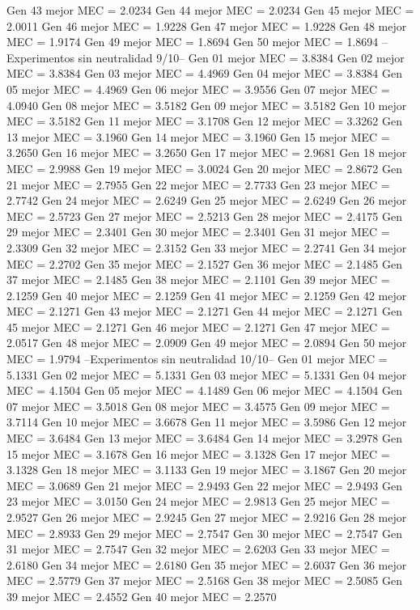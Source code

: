 Gen 43 mejor MEC = 2.0234
Gen 44 mejor MEC = 2.0234
Gen 45 mejor MEC = 2.0011
Gen 46 mejor MEC = 1.9228
Gen 47 mejor MEC = 1.9228
Gen 48 mejor MEC = 1.9174
Gen 49 mejor MEC = 1.8694
Gen 50 mejor MEC = 1.8694
--Experimentos sin neutralidad 9/10--
Gen 01 mejor MEC = 3.8384
Gen 02 mejor MEC = 3.8384
Gen 03 mejor MEC = 4.4969
Gen 04 mejor MEC = 3.8384
Gen 05 mejor MEC = 4.4969
Gen 06 mejor MEC = 3.9556
Gen 07 mejor MEC = 4.0940
Gen 08 mejor MEC = 3.5182
Gen 09 mejor MEC = 3.5182
Gen 10 mejor MEC = 3.5182
Gen 11 mejor MEC = 3.1708
Gen 12 mejor MEC = 3.3262
Gen 13 mejor MEC = 3.1960
Gen 14 mejor MEC = 3.1960
Gen 15 mejor MEC = 3.2650
Gen 16 mejor MEC = 3.2650
Gen 17 mejor MEC = 2.9681
Gen 18 mejor MEC = 2.9988
Gen 19 mejor MEC = 3.0024
Gen 20 mejor MEC = 2.8672
Gen 21 mejor MEC = 2.7955
Gen 22 mejor MEC = 2.7733
Gen 23 mejor MEC = 2.7742
Gen 24 mejor MEC = 2.6249
Gen 25 mejor MEC = 2.6249
Gen 26 mejor MEC = 2.5723
Gen 27 mejor MEC = 2.5213
Gen 28 mejor MEC = 2.4175
Gen 29 mejor MEC = 2.3401
Gen 30 mejor MEC = 2.3401
Gen 31 mejor MEC = 2.3309
Gen 32 mejor MEC = 2.3152
Gen 33 mejor MEC = 2.2741
Gen 34 mejor MEC = 2.2702
Gen 35 mejor MEC = 2.1527
Gen 36 mejor MEC = 2.1485
Gen 37 mejor MEC = 2.1485
Gen 38 mejor MEC = 2.1101
Gen 39 mejor MEC = 2.1259
Gen 40 mejor MEC = 2.1259
Gen 41 mejor MEC = 2.1259
Gen 42 mejor MEC = 2.1271
Gen 43 mejor MEC = 2.1271
Gen 44 mejor MEC = 2.1271
Gen 45 mejor MEC = 2.1271
Gen 46 mejor MEC = 2.1271
Gen 47 mejor MEC = 2.0517
Gen 48 mejor MEC = 2.0909
Gen 49 mejor MEC = 2.0894
Gen 50 mejor MEC = 1.9794
--Experimentos sin neutralidad 10/10--
Gen 01 mejor MEC = 5.1331
Gen 02 mejor MEC = 5.1331
Gen 03 mejor MEC = 5.1331
Gen 04 mejor MEC = 4.1504
Gen 05 mejor MEC = 4.1489
Gen 06 mejor MEC = 4.1504
Gen 07 mejor MEC = 3.5018
Gen 08 mejor MEC = 3.4575
Gen 09 mejor MEC = 3.7114
Gen 10 mejor MEC = 3.6678
Gen 11 mejor MEC = 3.5986
Gen 12 mejor MEC = 3.6484
Gen 13 mejor MEC = 3.6484
Gen 14 mejor MEC = 3.2978
Gen 15 mejor MEC = 3.1678
Gen 16 mejor MEC = 3.1328
Gen 17 mejor MEC = 3.1328
Gen 18 mejor MEC = 3.1133
Gen 19 mejor MEC = 3.1867
Gen 20 mejor MEC = 3.0689
Gen 21 mejor MEC = 2.9493
Gen 22 mejor MEC = 2.9493
Gen 23 mejor MEC = 3.0150
Gen 24 mejor MEC = 2.9813
Gen 25 mejor MEC = 2.9527
Gen 26 mejor MEC = 2.9245
Gen 27 mejor MEC = 2.9216
Gen 28 mejor MEC = 2.8933
Gen 29 mejor MEC = 2.7547
Gen 30 mejor MEC = 2.7547
Gen 31 mejor MEC = 2.7547
Gen 32 mejor MEC = 2.6203
Gen 33 mejor MEC = 2.6180
Gen 34 mejor MEC = 2.6180
Gen 35 mejor MEC = 2.6037
Gen 36 mejor MEC = 2.5779
Gen 37 mejor MEC = 2.5168
Gen 38 mejor MEC = 2.5085
Gen 39 mejor MEC = 2.4552
Gen 40 mejor MEC = 2.2570
